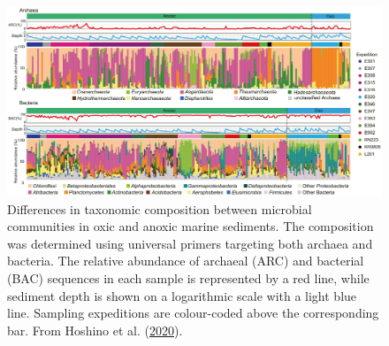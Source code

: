 \documentclass[
  12 pt,
]{book}
\begin{document}
\begin{figure}

{\centering \includegraphics[width=1\linewidth]{figures/hoshino2020} 

}

\caption{Differences in taxonomic composition between microbial communities in oxic and anoxic marine sediments. The composition was determined using universal primers targeting both archaea and bacteria. The relative abundance of archaeal (ARC) and bacterial (BAC) sequences in each sample is represented by a red line, while sediment depth is shown on a logarithmic scale with a light blue line. Sampling expeditions are colour-coded above the corresponding bar. From Hoshino et al. (\protect\hyperlink{ref-Hoshino2020}{2020}).}\label{fig:hoshino2020}
\end{figure}
\end{document}
